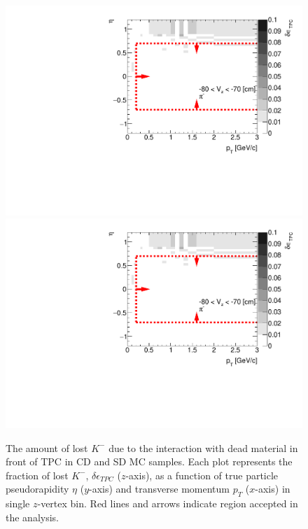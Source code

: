 \begin{figure}[H]
	\caption[The amount of lost $K^-$ due to the interaction with dead material in front of TPC as a function of $p_T$, $\eta$ and $z$-vertex in CD and SD]{The amount of lost $K^-$ due to the interaction with dead material in front of TPC in CD and SD MC samples. Each plot represents the fraction of lost $K^-$, $\delta\epsilon_{ TPC}$ ($z$-axis), as a function of true particle pseudorapidity $\eta$ ($y$-axis) and transverse momentum $p_{T}$ ($x$-axis) in single $z$-vertex bin. Red lines and arrows indicate region accepted in the analysis.}\label{fig:dead_materialCDSD3DKm}
	\parbox{0.325\textwidth}{
		\includegraphics[width=\linewidth,page=17]{graphics/systematicsEfficiency/deadMaterial/secondaries_Unbinned_SDCD_.pdf}\\
		\includegraphics[width=\linewidth,page=20]{graphics/systematicsEfficiency/deadMaterial/secondaries_Unbinned_SDCD_.pdf}\\
}
\end{figure}
